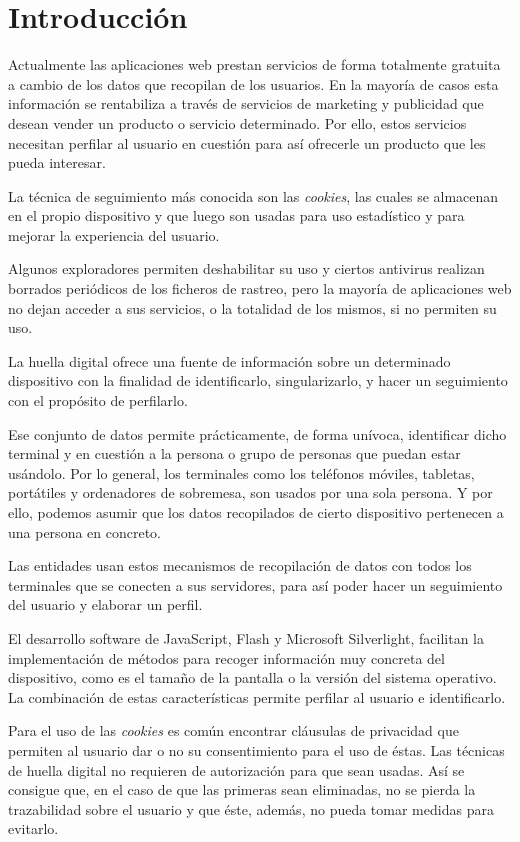 \chapter{Introducción}

Actualmente las aplicaciones web prestan servicios de forma totalmente gratuita a cambio de los datos que recopilan de los usuarios. En la mayoría de casos esta información se rentabiliza a través de servicios de marketing y publicidad que desean vender un producto o servicio determinado. Por ello, estos servicios necesitan perfilar al usuario en cuestión para así ofrecerle un producto que les pueda interesar.\par
La técnica de seguimiento más conocida  son las \textit{cookies}, las cuales se almacenan en el propio dispositivo y que luego son usadas para uso estadístico y para mejorar la experiencia del usuario.\par
Algunos exploradores permiten deshabilitar su uso y ciertos antivirus realizan borrados periódicos de los ficheros de rastreo, pero la mayoría de aplicaciones web no dejan acceder a sus servicios, o la totalidad de los mismos, si no permiten su uso.\par
La huella digital ofrece una fuente de información sobre un determinado dispositivo con la finalidad de identificarlo, singularizarlo, y hacer un seguimiento con el propósito de perfilarlo.\par
Ese conjunto de datos permite prácticamente, de forma unívoca, identificar dicho terminal y en cuestión a la persona o grupo de personas que puedan estar usándolo. Por lo general, los terminales como los teléfonos móviles, tabletas, portátiles y ordenadores de sobremesa, son usados por una sola persona. Y por ello, podemos asumir que los datos recopilados de cierto dispositivo pertenecen a una persona en concreto.\par
Las entidades usan estos mecanismos de recopilación de datos con todos los terminales que se conecten a sus servidores, para así poder hacer un seguimiento del usuario y elaborar un perfil.\par
El desarrollo software de JavaScript, Flash y Microsoft Silverlight, facilitan la implementación de métodos para recoger información muy concreta del dispositivo, como es el tamaño de la pantalla o la versión del sistema operativo. La combinación de estas características permite perfilar al usuario e identificarlo.\par
Para el uso de las \textit{cookies} es común encontrar cláusulas de privacidad que permiten al usuario dar o no su consentimiento para el uso de éstas. Las técnicas de huella digital no requieren de autorización para que sean usadas. Así se consigue que, en el caso de que las primeras sean eliminadas, no se pierda la trazabilidad sobre el usuario y que éste, además, no pueda tomar medidas para evitarlo.\par

